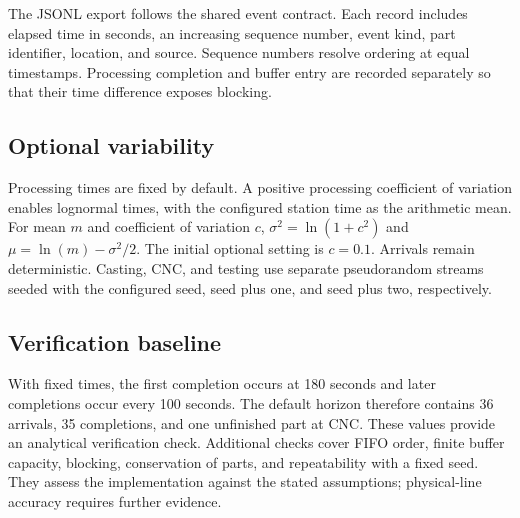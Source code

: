 The JSONL export follows the shared event contract. Each record includes
elapsed time in seconds, an increasing sequence number, event kind,
part identifier, location, and source. Sequence numbers resolve ordering
at equal timestamps. Processing completion and buffer entry are recorded
separately so that their time difference exposes blocking.

\subsection{Optional variability}
Processing times are fixed by default. A positive processing coefficient
of variation enables lognormal times, with the configured station time as
the arithmetic mean. For mean $m$ and coefficient of variation $c$,
$\sigma^2=\ln(1+c^2)$ and $\mu=\ln(m)-\sigma^2/2$.
The initial optional setting is $c=0.1$. Arrivals remain deterministic.
Casting, CNC, and testing use separate pseudorandom streams seeded with
the configured seed, seed plus one, and seed plus two, respectively.

\subsection{Verification baseline}
With fixed times, the first completion occurs at 180 seconds and later
completions occur every 100 seconds. The default horizon therefore contains
36 arrivals, 35 completions, and one unfinished part at CNC. These values
provide an analytical verification check. Additional checks cover FIFO
order, finite buffer capacity, blocking, conservation of parts, and
repeatability with a fixed seed. They assess the implementation against
the stated assumptions; physical-line accuracy requires further evidence.
